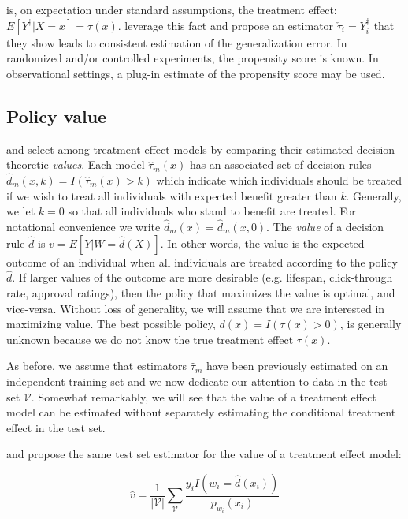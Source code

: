 is, on expectation under standard assumptions, the treatment effect: $E[Y^{\dagger}|X=x] = \tau(x)$. \citet{Gutierrez:2016tq} leverage this fact and propose an estimator $\check \tau_i = Y^{\dagger}_i$ that they show leads to consistent estimation of the generalization error. In randomized and/or controlled experiments, the propensity score is known. In observational settings, a plug-in estimate of the propensity score may be used.


\subsection{Policy value}

\citet{Kapelner:3baXYEjR} and \cite{Zhao:2017wa} select among treatment effect models by comparing their estimated decision-theoretic \emph{values}. Each model $\hat\tau_m(x)$ has an associated set of decision rules $\hat d_{m}(x,k) = I(\hat\tau_m(x) > k)$ which indicate which individuals should be treated if we wish to treat all individuals with expected benefit greater than $k$. Generally, we let $k=0$ so that all individuals who stand to benefit are treated. For notational convenience we write $\hat d_m(x) = \hat d_{m}(x,0)$. The \emph{value} of a decision rule $\hat d$ is $v = E[Y|W=\hat d(X)]$. In other words, the value is the expected outcome of an individual when all individuals are treated according to the policy $\hat d$. If larger values of the outcome are more desirable (e.g. lifespan, click-through rate, approval ratings), then the policy that maximizes the value is optimal, and vice-versa. Without loss of generality, we will assume that we are interested in maximizing value. The best possible policy, $d(x) = I(\tau(x) > 0)$, is generally unknown because we do not know the true treatment effect $\tau(x)$. 

As before, we assume that estimators $\hat\tau_m$ have been previously estimated on an independent training set and we now dedicate our attention to data in the test set $\mathcal{V}$. Somewhat remarkably, we will see that the value of a treatment effect model can be estimated without separately estimating the conditional treatment effect in the test set.

\citet{Kapelner:3baXYEjR} and \cite{Zhao:2017wa} propose the same test set estimator for the value of a treatment effect model:

\begin{equation}
\label{value}
\hat v = \frac{1}{|\mathcal{V}|}\sum_{\mathcal{V}} \frac{y_i I(w_i=\hat d(x_i))}{p_{w_i}(x_i)}
\end{equation}

